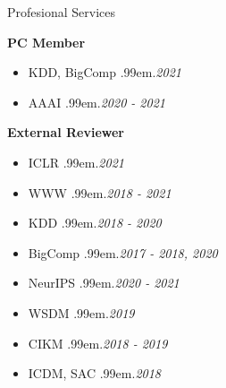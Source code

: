 \documentclass{resume} %
\makeatletter
\newcommand \Dotfill {\leavevmode \cleaders \hb@xt@ .99em{\hss .\hss }\hfill \kern \z@}
\makeatother
\begin{document}
\begin{rSection}{Profesional Services}


\textbf{PC Member}
\begin{itemize}[noitemsep]
	\item KDD, BigComp \smallskip \Dotfill \emph{2021}
	\item AAAI \smallskip \Dotfill \emph{2020 - 2021}
\end{itemize}

\textbf{External Reviewer}
\begin{itemize}[noitemsep]
	\item ICLR \smallskip \Dotfill \emph{2021} \\
	\item WWW \smallskip \Dotfill \emph{2018 - 2021} \\
	\item KDD \smallskip \Dotfill \emph{2018 - 2020} \\
	\item BigComp \smallskip \Dotfill \emph{2017 - 2018, 2020} \\
	\item NeurIPS \smallskip \Dotfill \emph{2020 - 2021} \\
	\item WSDM \smallskip \Dotfill \emph{2019} \\
	\item CIKM \smallskip \Dotfill \emph{2018 - 2019} \\
	\item ICDM, SAC \smallskip \Dotfill \emph{2018} \\
\end{itemize}

\end{rSection}


\begin{comment}
\begin{rSection}{Experience}

\textbf{Infosys Limited} \hfill Bengaluru, India \\ 
\emph{Student Intern} \hfill \emph{Jun. 2015 - Jul. 2015}

\textbf{SK Hynix} \hfill Incheon, South Korea \\ 
\emph{Student Intern} \hfill \emph{Dec. 2014 - Jan. 2015}

\textbf{KISTI} \hfill Daejeon, South Korea \\ 
\emph{Student Intern} \hfill \emph{Jan. 2014 - Feb. 2014}

\end{rSection}
\end{comment}
\end{document}
